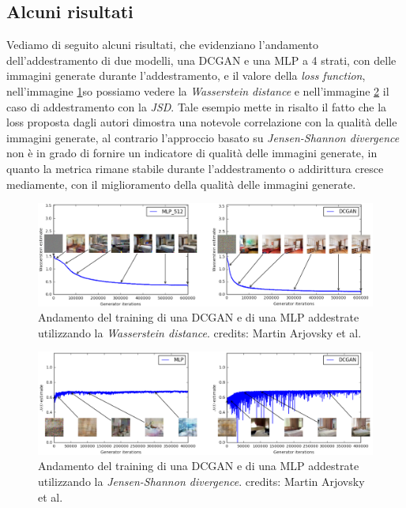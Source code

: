 \subsection{Alcuni risultati}
Vediamo di seguito alcuni risultati, che evidenziano l'andamento dell'addestramento di due modelli, una DCGAN e una MLP a 4 strati, con delle immagini
generate durante l'addestramento, e il valore della \textit{loss function}, nell'immagine \ref{fig:wgan_graph_1}so possiamo vedere la 
\textit{Wasserstein distance} e nell'immagine \ref{fig:wgan_graph_2} il caso di addestramento con la \textit{JSD}.
Tale esempio mette in risalto il fatto che la loss proposta dagli autori dimostra una notevole correlazione con la qualità delle immagini generate,
al contrario l'approccio basato su \textit{Jensen-Shannon divergence} non è in grado di fornire un indicatore di qualità delle immagini generate,
in quanto la metrica rimane stabile durante l'addestramento o addirittura cresce mediamente, con il miglioramento della qualità delle immagini generate.

    \begin{figure}[H]
        \centering
        \includegraphics[width=1.0\textwidth]{imgs/wgan_wtrain.png}
        \caption{Andamento del training di una DCGAN e di una MLP addestrate utilizzando la \textit{Wasserstein distance}. 
        credits: Martin Arjovsky et al. \cite{arjovsky2017wasserstein}}
        \label{fig:wgan_graph_1}
    \end{figure}
    \begin{figure}[H]
        \centering
        \includegraphics[width=1.0\textwidth]{imgs/wgan_nwtrain.png}
        \caption{Andamento del training di una DCGAN e di una MLP addestrate utilizzando la \textit{Jensen-Shannon divergence}. 
        credits: Martin Arjovsky et al. \cite{arjovsky2017wasserstein}}
        \label{fig:wgan_graph_2}
    \end{figure}

